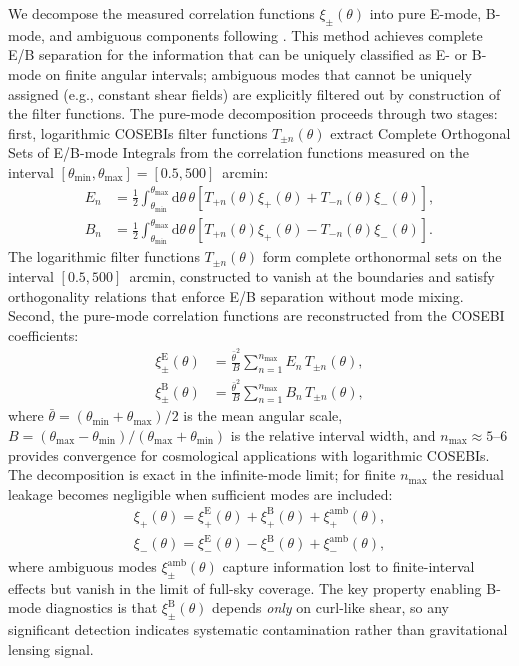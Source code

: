 \documentclass{aa}
\begin{document}
We decompose the measured correlation functions $\xi_\pm(\theta)$ into pure E-mode, B-mode, and ambiguous components following \citet{schneider.etal22}. This method achieves complete E/B separation for the information that can be uniquely classified as E- or B-mode on finite angular intervals; ambiguous modes that cannot be uniquely assigned (e.g., constant shear fields) are explicitly filtered out by construction of the filter functions. The pure-mode decomposition proceeds through two stages: first, logarithmic COSEBIs filter functions $T_{\pm n}(\theta)$ extract Complete Orthogonal Sets of E/B-mode Integrals from the correlation functions measured on the interval $[\theta_{\mathrm{min}}, \theta_{\mathrm{max}}] = [0.5, 500]$~arcmin:
\begin{align}
E_n &= \frac{1}{2} \int_{\theta_{\mathrm{min}}}^{\theta_{\mathrm{max}}} \mathrm{d}\theta \, \theta \left[ T_{+n}(\theta) \xi_+(\theta) + T_{-n}(\theta) \xi_-(\theta) \right], \label{eq:cosebi_en} \\
B_n &= \frac{1}{2} \int_{\theta_{\mathrm{min}}}^{\theta_{\mathrm{max}}} \mathrm{d}\theta \, \theta \left[ T_{+n}(\theta) \xi_+(\theta) - T_{-n}(\theta) \xi_-(\theta) \right]. \label{eq:cosebi_bn}
\end{align}
The logarithmic filter functions $T_{\pm n}(\theta)$ form complete orthonormal sets on the interval $[0.5, 500]$~arcmin, constructed to vanish at the boundaries and satisfy orthogonality relations that enforce E/B separation without mode mixing. Second, the pure-mode correlation functions are reconstructed from the COSEBI coefficients:
\begin{align}
\xi_\pm^{\mathrm{E}}(\theta) &= \frac{\bar{\theta}^2}{B} \sum_{n=1}^{n_{\mathrm{max}}} E_n \, T_{\pm n}(\theta), \label{eq:xi_E_reconstruction} \\
\xi_\pm^{\mathrm{B}}(\theta) &= \frac{\bar{\theta}^2}{B} \sum_{n=1}^{n_{\mathrm{max}}} B_n \, T_{\pm n}(\theta), \label{eq:xi_B_reconstruction}
\end{align}
where $\bar{\theta} = (\theta_{\mathrm{min}} + \theta_{\mathrm{max}})/2$ is the mean angular scale, $B = (\theta_{\mathrm{max}} - \theta_{\mathrm{min}})/(\theta_{\mathrm{max}} + \theta_{\mathrm{min}})$ is the relative interval width, and $n_{\mathrm{max}} \approx 5$--$6$ provides convergence for cosmological applications with logarithmic COSEBIs. The decomposition is exact in the infinite-mode limit; for finite $n_{\mathrm{max}}$ the residual leakage becomes negligible when sufficient modes are included:
\begin{align}
\xi_+(\theta) = \xi_+^{\mathrm{E}}(\theta) + \xi_+^{\mathrm{B}}(\theta) + \xi_+^{\mathrm{amb}}(\theta), \\
\xi_-(\theta) = \xi_-^{\mathrm{E}}(\theta) - \xi_-^{\mathrm{B}}(\theta) + \xi_-^{\mathrm{amb}}(\theta),
\label{eq:exact_decomposition}
\end{align}
where ambiguous modes $\xi_\pm^{\mathrm{amb}}(\theta)$ capture information lost to finite-interval effects but vanish in the limit of full-sky coverage. The key property enabling B-mode diagnostics is that $\xi_\pm^{\mathrm{B}}(\theta)$ depends \textit{only} on curl-like shear, so any significant detection indicates systematic contamination rather than gravitational lensing signal.
\end{document}
